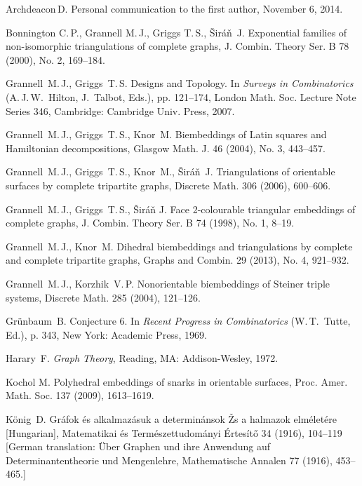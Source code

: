 \documentclass[12pt]{article}
\begin{document}


\begin{thebibliography}{99}

 Archdeacon\,D. Personal communication to the first author, November 6, 2014.

 Bonnington C.\,P., Grannell M.\,J., Griggs T.\,S., \v{S}ir\'a\v{n}\ J. 
Exponential families of non-isomorphic triangulations of complete graphs,
J. Combin. Theory Ser. B 78 (2000), No. 2, 169--184.

 Grannell\ M.\,J., Griggs\ T.\,S. Designs and Topology. In {\it Surveys in Combinatorics} (A.\,J.\,W.\ Hilton, J.\ Talbot, Eds.), pp. 121--174, London Math. Soc. Lecture Note Series 346, Cambridge: Cambridge Univ. Press, 2007.

 Grannell\ M.\,J., Griggs\ T.\,S., Knor\ M. Biembeddings of Latin squares and Hamiltonian decompositions, Glasgow Math. J. 46 (2004), No. 3, 443--457.

 Grannell\ M.\,J., Griggs\ T.\,S., Knor\ M., \v{S}ir\'a\v{n}\ J. Triangulations of orientable surfaces by complete tripartite graphs, Discrete Math. 306 (2006), 600--606.

 Grannell\ M.\,J., Griggs\ T.\,S., \v{S}ir\'a\v{n} J. Face 2-colourable triangular embeddings of complete graphs, J. Combin. Theory Ser. B 74 (1998), No. 1, 8--19.

 Grannell\ M.\,J., Knor\ M. Dihedral biembeddings and triangulations by
complete and complete tripartite graphs, Graphs and Combin. 29 (2013), No. 4, 921--932.

 Grannell\ M.\,J., Korzhik\ V.\,P. Nonorientable biembeddings of Steiner triple systems, Discrete Math. 285 (2004), 121--126.

 Gr\"unbaum\ B. Conjecture 6. In {\it Recent Progress in Combinatorics} (W.\,T.\ Tutte, Ed.), p. 343, New York: Academic Press, 1969.

 Harary\ F. {\it Graph Theory}, Reading, MA: Addison-Wesley, 1972. 

 Kochol M. Polyhedral embeddings of snarks in orientable surfaces, Proc. Amer. Math. Soc. 137 (2009), 1613--1619.

 K\"onig\ D. Gr\'afok \'es alkalmaz\'asuk a determin\'ansok \v{Z}s a halmazok elm\'elet\'ere [Hungarian], Matematikai \'es Term\'eszettudom\'anyi \'Ertes\'it\H{o} 34 (1916), 104--119 [German translation: \"Uber Graphen und ihre Anwendung auf Determinantentheorie und Mengenlehre, Mathematische Annalen
77 (1916), 453--465.]


\end{thebibliography}
\end{document}

